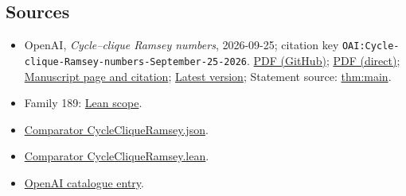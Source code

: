 \documentclass[11pt]{article}
\begin{document}
\subsection{Sources}
\begin{itemize}
\item OpenAI, \emph{Cycle–clique Ramsey numbers}, 2026-09-25; citation key \texttt{OAI:Cycle-clique-Ramsey-numbers-September-25-2026}. \href{https://github.com/openai/math/blob/adc7f1241b42e322a6451854ab7e4b4c146bf78a/preprints/Cycle-clique-Ramsey-numbers-September-25-2026/Cycle-clique-Ramsey-numbers-September-25-2026.pdf}{PDF (GitHub)}; \href{https://github.com/openai/math/raw/adc7f1241b42e322a6451854ab7e4b4c146bf78a/preprints/Cycle-clique-Ramsey-numbers-September-25-2026/Cycle-clique-Ramsey-numbers-September-25-2026.pdf}{PDF (direct)}; \href{https://github.com/openai/math/blob/adc7f1241b42e322a6451854ab7e4b4c146bf78a/preprints/Cycle-clique-Ramsey-numbers-September-25-2026/README.md}{Manuscript page and citation}; \href{https://github.com/openai/math/blob/main/preprints/Cycle-clique-Ramsey-numbers-September-25-2026/Cycle-clique-Ramsey-numbers-September-25-2026.pdf}{Latest version}; Statement source: \href{https://github.com/openai/math/blob/adc7f1241b42e322a6451854ab7e4b4c146bf78a/preprints/Cycle-clique-Ramsey-numbers-September-25-2026/build/sections/01-introduction.tex\#L10}{thm:main}.
\item Family 189: \href{https://github.com/openai/math/blob/adc7f1241b42e322a6451854ab7e4b4c146bf78a/lean/docs/189.md}{Lean scope}.
\item \href{https://github.com/openai/math/blob/adc7f1241b42e322a6451854ab7e4b4c146bf78a/lean/ComparatorChallenges/CycleCliqueRamsey.json}{Comparator CycleCliqueRamsey.json}.
\item \href{https://github.com/openai/math/blob/adc7f1241b42e322a6451854ab7e4b4c146bf78a/lean/ComparatorChallenges/CycleCliqueRamsey.lean}{Comparator CycleCliqueRamsey.lean}.
\item \href{https://github.com/openai/math/blob/adc7f1241b42e322a6451854ab7e4b4c146bf78a/CONTENTS.md}{OpenAI catalogue entry}.
\end{itemize}
\end{document}
